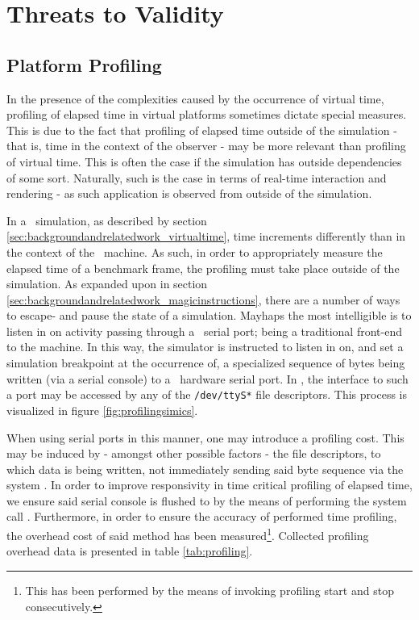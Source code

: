 
\chapter{Threats to Validity}

\section{Platform Profiling}
\label{sec:threatstovalidity_platformprofiling}
In the presence of the complexities caused by the occurrence of virtual time, profiling of elapsed time in virtual platforms sometimes dictate special measures.
This is due to the fact that profiling of elapsed time outside of the simulation - that is, time in the context of the observer - may be more relevant than profiling of virtual time.
This is often the case if the simulation has outside dependencies of some sort.
Naturally, such is the case in terms of real-time interaction and rendering - as such application is observed from outside of the simulation.

In a \dvttermsimics\ simulation, as described by section \ref{sec:backgroundandrelatedwork_virtualtime}, time increments differently than in the context of the \dvttermhost\ machine.
As such, in order to appropriately measure the elapsed time of a benchmark frame, the profiling must take place outside of the simulation.
As expanded upon in section \ref{sec:backgroundandrelatedwork_magicinstructions}, there are a number of ways to escape- and pause the state of a simulation.
Mayhaps the most intelligible is to listen in on activity passing through a \dvttermtarget\ serial port; being a traditional front-end to the machine.
In this way, the simulator is instructed to listen in on, and set a simulation breakpoint at the occurrence of, a specialized sequence of bytes being written (via a serial console) to a \dvttermuart\ hardware serial port.
In \dvttermlinux , the interface to such a port may be accessed by any of the \texttt{/dev/ttyS*} file descriptors.
This process is visualized in figure \ref{fig:profilingsimics}.



When using serial ports in this manner, one may introduce a profiling cost.
This may be induced by - amongst other possible factors - the file descriptors, to which data is being written, not immediately sending said byte sequence via the system \dvttermuart .
In order to improve responsivity in time critical profiling of elapsed time, we ensure said serial console is flushed to by the means of performing the system call .
Furthermore, in order to ensure the accuracy of performed time profiling, the overhead cost of said method has been measured\footnote{This has been performed by the means of invoking profiling start and stop consecutively.}.
Collected profiling overhead data is presented in table \ref{tab:profiling}.

